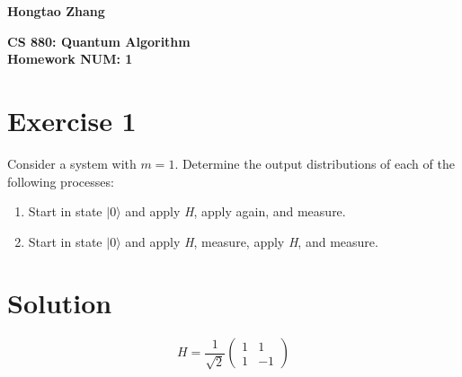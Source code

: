 \documentclass{article}%
\begin{document}
\begin{flushright}
\textbf{Hongtao Zhang \\}
\end{flushright}

\begin{center}
\textbf{CS 880: Quantum Algorithm \\
Homework NUM: 1} \\
\end{center}

\section*{Exercise 1}
Consider a system with $m=1$. Determine the output distributions of each of the following processes:
\begin{enumerate}
    \item Start in state $|0\rangle$ and apply \textit{H}, apply again, and measure.
    \item Start in state $|0\rangle$ and apply \textit{H}, measure, apply \textit{H}, and measure.
\end{enumerate}


\section*{Solution}

\begin{equation}
    H = \frac{1}{\sqrt{2}}\begin{pmatrix}
        1 & 1 \\
        1 & -1
    \end{pmatrix}
\end{equation}
\end{document}
